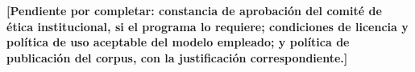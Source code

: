 \medskip
\noindent
\textbf{[Pendiente por completar: constancia de aprobación del comité de ética
institucional, si el programa lo requiere; condiciones de licencia y política de
uso aceptable del modelo empleado; y política de publicación del corpus, con la
justificación correspondiente.]}


%
%
%
%
%
%
%
%
%
%
%
%
%
